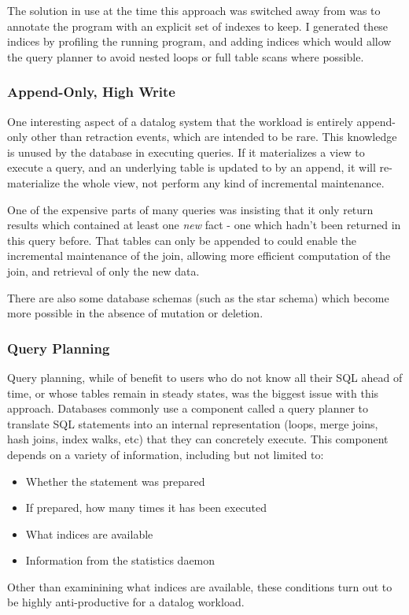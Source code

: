 The solution in use at the time this approach was switched away from was to annotate the program with an explicit set of indexes to keep.
I generated these indices by profiling the running program, and adding indices which would allow the query planner to avoid nested loops or full table scans where possible.

\subsubsection{Append-Only, High Write}
One interesting aspect of a datalog system that the workload is entirely append-only other than retraction events, which are intended to be rare.
This knowledge is unused by the database in executing queries.
If it materializes a view to execute a query, and an underlying table is updated to by an append, it will re-materialize the whole view, not perform any kind of incremental maintenance.

One of the expensive parts of many queries was insisting that it only return results which contained at least one \emph{new} fact - one which hadn't been returned in this query before.
That tables can only be appended to could enable the incremental maintenance of the join, allowing more efficient computation of the join, and retrieval of only the new data.

There are also some database schemas (such as the star schema) which become more possible in the absence of mutation or deletion.
\subsubsection{Query Planning}
Query planning, while of benefit to users who do not know all their SQL ahead of time, or whose tables remain in steady states, was the biggest issue with this approach.
Databases commonly use a component called a query planner to translate SQL statements into an internal representation (loops, merge joins, hash joins, index walks, etc) that they can concretely execute.
This component depends on a variety of information, including but not limited to:
\begin{itemize}
	\item Whether the statement was prepared
	\item If prepared, how many times it has been executed
	\item What indices are available
	\item Information from the statistics daemon
\end{itemize}
Other than examinining what indices are available, these conditions turn out to be highly anti-productive for a datalog workload.


